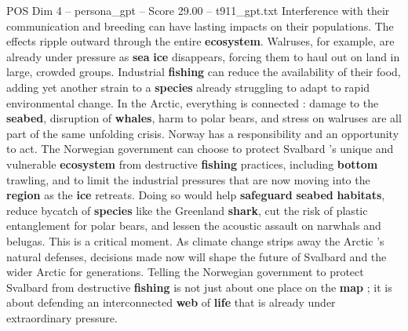 \begin{textsample}{POS Dim 4 – persona\_gpt – Score 29.00 – t911\_gpt.txt}
Interference with their communication and breeding can have lasting impacts on their populations.
The effects ripple outward through the entire \textbf{ecosystem}.
Walruses, for example, are already under pressure as \textbf{sea} \textbf{ice} disappears, forcing them to haul out on land in large, crowded groups.
Industrial \textbf{fishing} can reduce the availability of their food, adding yet another strain to a \textbf{species} already struggling to adapt to rapid environmental change.
In the Arctic, everything is connected : damage to the \textbf{seabed}, disruption of \textbf{whales}, harm to polar bears, and stress on walruses are all part of the same unfolding crisis.
Norway has a responsibility and an opportunity to act.
The Norwegian government can choose to protect Svalbard ’s unique and vulnerable \textbf{ecosystem} from destructive \textbf{fishing} practices, including \textbf{bottom} trawling, and to limit the industrial pressures that are now moving into the \textbf{region} as the \textbf{ice} retreats.
Doing so would help \textbf{safeguard} \textbf{seabed} \textbf{habitats}, reduce bycatch of \textbf{species} like the Greenland \textbf{shark}, cut the risk of plastic entanglement for polar bears, and lessen the acoustic assault on narwhals and belugas.
This is a critical moment.
As climate change strips away the Arctic ’s natural defenses, decisions made now will shape the future of Svalbard and the wider Arctic for generations.
Telling the Norwegian government to protect Svalbard from destructive \textbf{fishing} is not just about one place on the \textbf{map} ; it is about defending an interconnected \textbf{web} of \textbf{life} that is already under extraordinary pressure.

\end{textsample}
